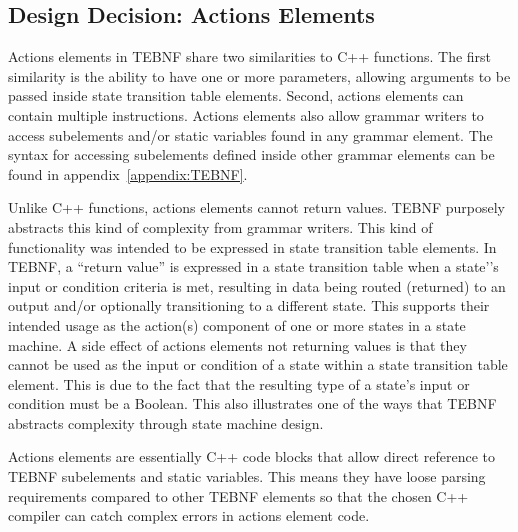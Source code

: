 \subsection{Design Decision: Actions Elements} \label{ssec:ActionsElements}
Actions elements in TEBNF share two similarities to C++ functions. The first similarity is the ability to have one or more parameters, allowing arguments to be passed inside state transition table elements.  Second, actions elements can contain multiple instructions.  Actions elements also allow grammar writers to access subelements and/or static variables found in any grammar element.  The syntax for accessing subelements defined inside other grammar elements can be found in appendix~\ref{appendix:TEBNF}.

\indent
Unlike C++ functions, actions elements cannot return values.  TEBNF purposely abstracts this kind of complexity from grammar writers.  This kind of functionality was intended to be expressed in state transition table elements.  In TEBNF, a “return value” is expressed in a state transition table when a state'’s input or condition criteria is met, resulting in data being routed (returned) to an output and/or optionally transitioning to a different state.  This supports their intended usage as the action(s) component of one or more states in a state machine.  A side effect of actions elements not returning values is that they cannot be used as the input or condition of a state within a state transition table element.  This is due to the fact that the resulting type of a state’s input or condition must be a Boolean.  This also illustrates one of the ways that TEBNF abstracts complexity through state machine design.

\indent
Actions elements are essentially C++ code blocks that allow direct reference to TEBNF subelements and static variables.  This means they have loose parsing requirements compared to other TEBNF elements so that the chosen C++ compiler can catch complex errors in actions element code.

